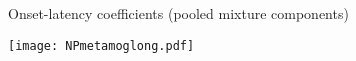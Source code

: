 \begin{frame}{Onset-latency coefficients (pooled mixture components)} 
	\begin{center}	
		\texttt{[image: NPmetamoglong.pdf]}
	\end{center}
\end{frame}
